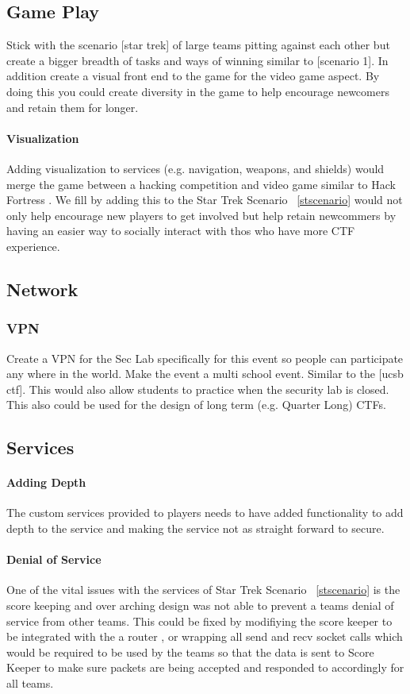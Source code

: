 \documentclass[10pt]{article}
\begin{document}
\subsection{Game Play}
Stick with the scenario [star trek] of large teams pitting against each other 
but create a bigger breadth of tasks and ways of winning similar to [scenario 1].
In addition create a visual front end to the game for the video game aspect.
By doing this you could create diversity in the game to help encourage newcomers
and retain them for longer.

\paragraph*{Visualization}
Adding visualization to services (e.g. navigation, weapons, and shields) would merge the game
between a hacking competition and video game similar to Hack Fortress \cite{HackFortress}.
We fill by adding this to the Star Trek Scenario ~\ref{stscenario} would not only
help encourage new players to get involved but help retain newcommers by having
an easier way to socially interact with thos who have more CTF experience.

\subsection{Network}

\subsubsection{VPN}
Create a VPN for the Sec Lab specifically for this event so people can participate any where
in the world. Make the event a multi school event. Similar to the [ucsb ctf]. This would
also allow students to practice when the security lab is closed. This also could be used
for the design of long term (e.g. Quarter Long) CTFs.

\subsection{Services}

\paragraph*{Adding Depth}
The custom services provided to players needs to have added functionality to add depth
to the service and making the service not as straight forward to secure.

\paragraph*{Denial of Service}
One of the vital issues with the services of Star Trek Scenario ~\ref{stscenario} is the
score keeping and over arching design was not able to prevent a teams denial of service
from other teams. This could be fixed by modifiying the score keeper to be integrated with
the a router \cite{BlackHat2004}, or wrapping all send and recv socket calls which
would be required to be used by the teams so that the data is sent to Score Keeper 
to make sure packets are being accepted and responded to accordingly for all teams.
\end{document}
